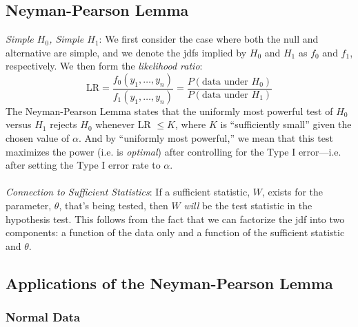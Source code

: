 \documentclass[a4paper,12pt]{scrartcl}
\begin{document}
\subsection{Neyman-Pearson Lemma}

{\sl Simple $H_0$, Simple $H_1$}: We first consider the case where 
both the null and alternative are simple, and we denote the jdfs
implied by $H_0$ and $H_1$ as $f_0$ and $f_1$, respectively. We
then form the \emph{likelihood ratio}:
\[ \text{LR} = \frac{f_0(y_1, \ldots, y_n)}{f_1(y_1, \ldots, y_n)}=
   \frac{P(\text{data under $H_0$})}{P(\text{data under $H_1$})}
   \]
The Neyman-Pearson Lemma states that the uniformly most powerful
test of $H_0$ versus $H_1$ rejects $H_0$ whenever LR $\leq K$,
where $K$ is ``sufficiently small'' given the chosen value of $\alpha$.
And by ``uniformly most powerful,'' we mean that this test 
maximizes the power (i.e. is \emph{optimal})
after controlling for the Type I error---i.e.
after setting the Type I error rate to $\alpha$.
\\
\\
{\sl Connection to Sufficient Statistics}: If a sufficient statistic, 
$W$, exists for the parameter, $\theta$, that's being tested, then 
$W$ \emph{will} be the test statistic in the hypothesis test. This 
follows from the fact that we can factorize the jdf into two
components: a function of the data only and a function of the sufficient
statistic and $\theta$.

\subsection{Applications of the Neyman-Pearson Lemma}

\subsubsection{Normal Data}
\end{document}

